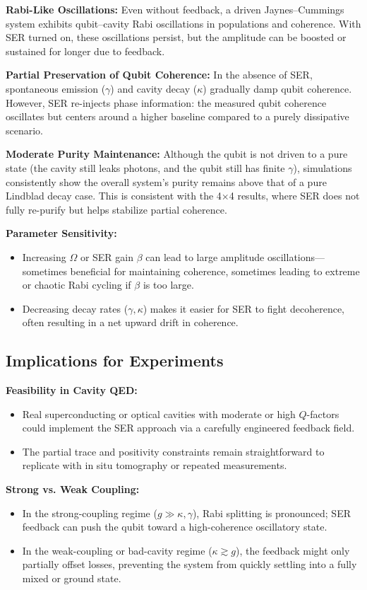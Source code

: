 \documentclass{article}
\begin{document}
\textbf{Rabi-Like Oscillations:}
Even without feedback, a driven Jaynes--Cummings system exhibits qubit--cavity Rabi oscillations in populations and coherence. With SER turned on, these oscillations persist, but the amplitude can be boosted or sustained for longer due to feedback.

\textbf{Partial Preservation of Qubit Coherence:}
In the absence of SER, spontaneous emission ($\gamma$) and cavity decay ($\kappa$) gradually damp qubit coherence. However, SER re-injects phase information: the measured qubit coherence oscillates but centers around a higher baseline compared to a purely dissipative scenario.

\textbf{Moderate Purity Maintenance:}
Although the qubit is not driven to a pure state (the cavity still leaks photons, and the qubit still has finite $\gamma$), simulations consistently show the overall system’s purity remains above that of a pure Lindblad decay case. This is consistent with the 4$\times$4 results, where SER does not fully re-purify but helps stabilize partial coherence.

\textbf{Parameter Sensitivity:}
\begin{itemize}
    \item Increasing $\Omega$ or SER gain $\beta$ can lead to large amplitude oscillations—sometimes beneficial for maintaining coherence, sometimes leading to extreme or chaotic Rabi cycling if $\beta$ is too large.
    \item Decreasing decay rates ($\gamma, \kappa$) makes it easier for SER to fight decoherence, often resulting in a net upward drift in coherence.
\end{itemize}

\subsection{Implications for Experiments}
\textbf{Feasibility in Cavity QED:}
\begin{itemize}
    \item Real superconducting or optical cavities with moderate or high $Q$-factors could implement the SER approach via a carefully engineered feedback field.
    \item The partial trace and positivity constraints remain straightforward to replicate with in situ tomography or repeated measurements.
\end{itemize}

\textbf{Strong vs. Weak Coupling:}
\begin{itemize}
    \item In the strong-coupling regime ($g \gg \kappa, \gamma$), Rabi splitting is pronounced; SER feedback can push the qubit toward a high-coherence oscillatory state.
    \item In the weak-coupling or bad-cavity regime ($\kappa \gtrsim g$), the feedback might only partially offset losses, preventing the system from quickly settling into a fully mixed or ground state.
\end{itemize}
\end{document}
